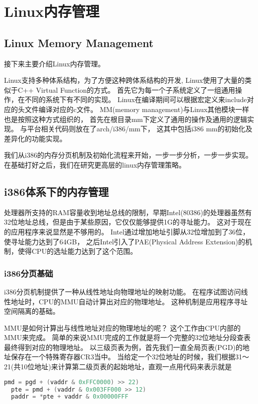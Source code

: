 
\chapter{Linux内存管理}

\section{Linux Memory Management}
接下来主要介绍Linux内存管理。

Linux支持多种体系结构，为了方便这种跨体系结构的开发, Linux使用了大量的类似于C++ Virtual Function的方式。
首先它为每一个子系统定义了一组通用操作，在不同的系统下有不同的实现。
Linux在编译期间可以根据宏定义来include对应的头文件编译对应的c文件。
MM(memory management)与Linux其他模块一样也是按照这种方式组织的， 首先在根目录mm下定义了通用的操作及通用的逻辑实现。
与平台相关代码则放在了arch/i386/mm下， 这其中包括i386 mm的初始化及差异化的功能实现。

我们从i386的内存分页机制及初始化流程来开始，一步一步分析，一步一步实现。
在基础打好之后，我们在研究更高层的linux内存管理策略。


\section{i386体系下的内存管理}


处理器所支持的RAM容量收到地址总线的限制，早期Intel(80386)的处理器虽然有32位地址总线，但是由于某些原因，它仅仅能够提供1G的寻址能力。
这对于现在的应用程序来说显然是不够用的。
Intel通过增加地址引脚从32位增加到了36位，使寻址能力达到了64GB， 之后Intel引入了PAE(Physical Address Extension)的机制，使得CPU的选址能力达到了这个范围。

\subsection{i386分页基础}
i386分页机制提供了一种从线性地址向物理地址的映射功能。
在程序试图访问线性地址时，CPU的MMU自动计算出对应的物理地址。 
这种机制是应用程序寻址空间隔离的基础。

MMU是如何计算出与线性地址对应的物理地址的呢？ 这个工作由CPU内部的MMU来完成。
简单的来说MMU完成的工作就是将一个完整的32位地址分段查表最终得到对应的物理地址。
以三级页表为例，首先我们一直全局页表(PGD)的地址保存在一个特殊寄存器CR3当中。
当给定一个32位地址的时候，我们根据31～21(共10位地址)来计算第二级页表的起始地址，直观一点用代码来表示就是\begin{lstlisting}[language=C]
  pmd = pgd + (vaddr & 0xFFC0000) >> 22)
  pte = pmd + (vaddr & 0x003FF000 >> 12)
  paddr = *pte + vaddr & 0x00000FFF
\end{lstlisting}

